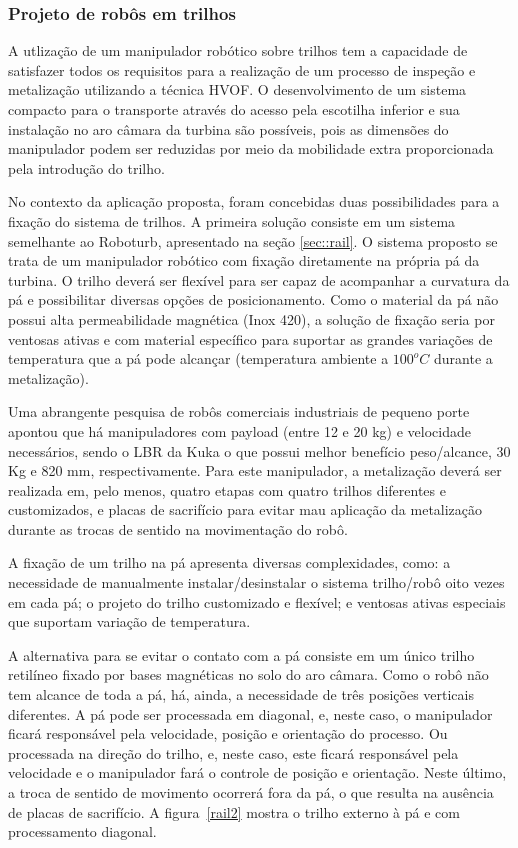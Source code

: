 \subsubsection{Projeto de robôs em trilhos}\label{proj_rail}
 
A utlização de um manipulador robótico sobre trilhos tem a
capacidade de satisfazer todos os requisitos para a realização de um
processo de inspeção e metalização utilizando a técnica HVOF. O desenvolvimento
de um sistema compacto para o transporte através do acesso pela escotilha
inferior e sua instalação no aro câmara da turbina são possíveis, pois as
dimensões do manipulador podem ser reduzidas por meio da
mobilidade extra proporcionada pela introdução do trilho.

No contexto da aplicação proposta, foram concebidas duas possibilidades para a
fixação do sistema de trilhos. A primeira solução consiste em um sistema
semelhante ao Roboturb, apresentado na seção \ref{sec::rail}. O sistema proposto
se trata de um manipulador robótico com fixação diretamente na própria pá da
turbina. O trilho deverá ser flexível para ser capaz de acompanhar a curvatura
da pá e possibilitar diversas opções de posicionamento. Como o material da pá
não possui alta permeabilidade magnética (Inox 420), a solução de fixação seria
por ventosas ativas e com material específico para suportar as grandes
variações de temperatura que a pá pode alcançar (temperatura ambiente a
$100^oC$ durante a metalização).

Uma abrangente pesquisa de robôs comerciais industriais de pequeno porte apontou
que há manipuladores com payload (entre 12 e 20 kg) e velocidade necessários,
sendo o LBR da Kuka o que possui melhor benefício peso/alcance, 30 Kg e 820 mm,
respectivamente. Para este manipulador, a metalização deverá ser
realizada em, pelo menos, quatro etapas com quatro trilhos diferentes e
customizados, e placas de sacrifício para evitar mau aplicação da metalização
durante as trocas de sentido na movimentação do robô.

A fixação de um trilho na pá apresenta diversas complexidades, como: a
necessidade de manualmente instalar/desinstalar o sistema trilho/robô oito vezes
em cada pá; o projeto do trilho customizado e flexível; e ventosas ativas
especiais que suportam variação de temperatura.

A alternativa para se evitar o contato com a pá consiste em um único trilho
retilíneo fixado por bases magnéticas no solo do aro câmara. Como o robô não
tem alcance de toda a pá, há, ainda, a necessidade de três posições verticais
diferentes. A pá pode ser processada em diagonal, e, neste caso, o manipulador
ficará responsável pela velocidade, posição e orientação do processo. Ou processada na
direção do trilho, e, neste caso, este ficará responsável pela velocidade e o
manipulador fará o controle de posição e orientação. Neste último, a troca de
sentido de movimento ocorrerá fora da pá, o que resulta na ausência de placas de
sacrifício. A figura~\ref{rail2} mostra o trilho externo à pá e com
processamento diagonal.

